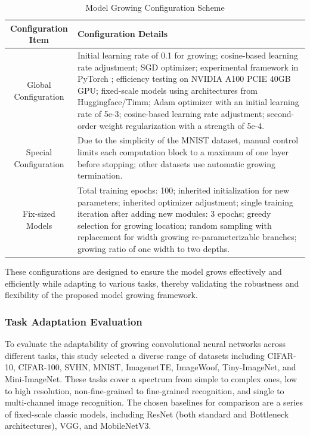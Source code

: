 \documentclass[preprint,12pt]{elsarticle}
\begin{document}
\begin{table}[ht]
\centering
\tiny
\renewcommand{\arraystretch}{1.3}
\begin{adjustbox}{center}
\begin{tabular}{c|p{10cm}}
\hline
\textbf{Configuration Item} & \textbf{Configuration Details} \\
\hline
Global Configuration & Initial learning rate of 0.1 for growing; cosine-based learning rate adjustment; SGD optimizer; experimental framework in PyTorch \cite{pytorch}; efficiency testing on NVIDIA A100 PCIE 40GB GPU; fixed-scale models using architectures from Huggingface/Timm; Adam optimizer with an initial learning rate of 5e-3; cosine-based learning rate adjustment; second-order weight regularization with a strength of 5e-4. \\
\hline
Special Configuration & Due to the simplicity of the MNIST dataset, manual control limits each computation block to a maximum of one layer before stopping; other datasets use automatic growing termination. \\
\hline
Fix-sized Models & Total training epochs: 100; inherited initialization for new parameters; inherited optimizer adjustment; single training iteration after adding new modules: 3 epochs; greedy selection for growing location; random sampling with replacement for width growing re-parameterizable branches; growing ratio of one width to two depths. \\
\hline
\end{tabular}
\end{adjustbox}
\caption{Model Growing Configuration Scheme}
\label{table:growth_configuration}
\end{table}

These configurations are designed to ensure the model grows effectively and efficiently while adapting to various tasks, thereby validating the robustness and flexibility of the proposed model growing framework.

\subsubsection{Task Adaptation Evaluation}

To evaluate the adaptability of growing convolutional neural networks across different tasks, this study selected a diverse range of datasets including CIFAR-10, CIFAR-100, SVHN, MNIST, ImagenetTE, ImageWoof, Tiny-ImageNet, and Mini-ImageNet. These tasks cover a spectrum from simple to complex ones, low to high resolution, non-fine-grained to fine-grained recognition, and single to multi-channel image recognition. The chosen baselines for comparison are a series of fixed-scale classic models, including ResNet (both standard and Bottleneck architectures), VGG, and MobileNetV3.
\end{document}
